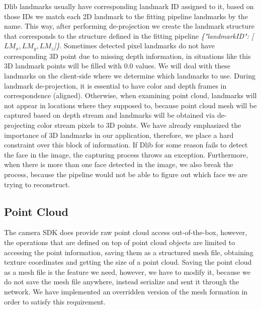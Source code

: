 Dlib landmarks usually have corresponding landmark ID assigned to it, based on those IDs we match each 2D landmark to the fitting pipeline landmarks by the name. This way, after performing de-projection we create the landmark structure that corresponds to the structure defined in the fitting pipeline \textit{\{"landmarkID": [$LM_x, LM_y, LM_z$]\}}. Sometimes detected pixel landmarks do not have corresponding 3D point due to missing depth information, in situations like this 3D landmark points will be filled with 0.0 values. We will deal with these landmarks on the client-side where we determine which landmarks to use. During landmark de-projection, it is essential to have color and depth frames in correspondence (aligned). Otherwise, when examining point cloud, landmarks will not appear in locations where they supposed to, because point cloud mesh will be captured based on depth stream and landmarks will be obtained via de-projecting color stream pixels to 3D points. We have already emphasized the importance of 3D landmarks in our application, therefore, we place a hard constraint over this block of information. If Dlib for some reason fails to detect the face in the image, the capturing process throws an exception. Furthermore, when there is more than one face detected in the image, we also break the process, because the pipeline would not be able to figure out which face we are trying to reconstruct. 


\subsection{Point Cloud}\label{s3.3.3}
The camera SDK does provide raw point cloud access out-of-the-box, however, the operations that are defined on top of point cloud objects are limited to accessing the point information, saving them as a structured mesh file, obtaining texture coordinates and getting the size of a point cloud. Saving the point cloud as a mesh file is the feature we need, however, we have to modify it, because we do not save the mesh file anywhere, instead serialize and sent it through the network. We have implemented an overridden version of the mesh formation in order to satisfy this requirement. 

